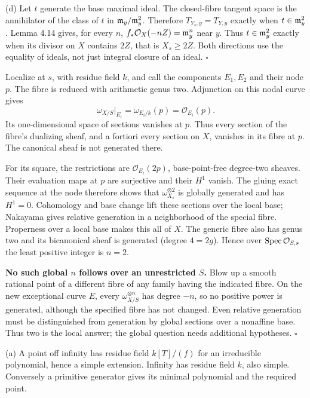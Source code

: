 \documentclass[11pt]{article}
\let\chapterexercise\exercise
\renewcommand{\exercise}[2]{\Needspace{8\baselineskip}\chapterexercise{#1}{#2}}
\begin{document}
(d) Let $t$ generate the base maximal ideal. The closed-fibre tangent space is the annihilator of the class of $t$ in $\mathfrak m_y/\mathfrak m_y^2$. Therefore $T_{Y_s,y}=T_{Y,y}$ exactly when $t\in\mathfrak m_y^2$. Lemma 4.14 gives, for every $n$, $f_*\mathcal O_X(-nZ)=\mathfrak m_y^n$ near $y$. Thus $t\in\mathfrak m_y^2$ exactly when its divisor on $X$ contains $2Z$, that is $X_s\ge2Z$. Both directions use the equality of ideals, not just integral closure of an ideal. \hfill$\square$

\pf Localize at $s$, with residue field $k$, and call the components $E_1,E_2$ and their node $p$. The fibre is reduced with arithmetic genus two. Adjunction on this nodal curve gives
\[ \omega_{X/S}|_{E_i}=\omega_{E_i/k}(p)=\mathcal O_{E_i}(p). \]
Its one-dimensional space of sections vanishes at $p$. Thus every section of the fibre's dualizing sheaf, and a fortiori every section on $X$, vanishes in its fibre at $p$. The canonical sheaf is not generated there.

For its square, the restrictions are $\mathcal O_{E_i}(2p)$, base-point-free degree-two sheaves. Their evaluation maps at $p$ are surjective and their $H^1$ vanish. The gluing exact sequence at the node therefore shows that $\omega_{X_s}^{\otimes2}$ is globally generated and has $H^1=0$. Cohomology and base change lift these sections over the local base; Nakayama gives relative generation in a neighborhood of the special fibre. Properness over a local base makes this all of $X$. The generic fibre also has genus two and its bicanonical sheaf is generated (degree $4=2g$). Hence over $\operatorname{Spec}\mathcal O_{S,s}$ the least positive integer is $n=2$.

\textbf{No such global $n$ follows over an unrestricted $S$.} Blow up a smooth rational point of a different fibre of any family having the indicated fibre. On the new exceptional curve $E$, every $\omega_{X/S}^{\otimes n}$ has degree $-n$, so no positive power is generated, although the specified fibre has not changed. Even relative generation must be distinguished from generation by global sections over a nonaffine base. Thus two is the local answer; the global question needs additional hypotheses. \hfill$\square$

\pf (a) A point off infinity has residue field $k[T]/(f)$ for an irreducible polynomial, hence a simple extension. Infinity has residue field $k$, also simple. Conversely a primitive generator gives its minimal polynomial and the required point.
\end{document}
